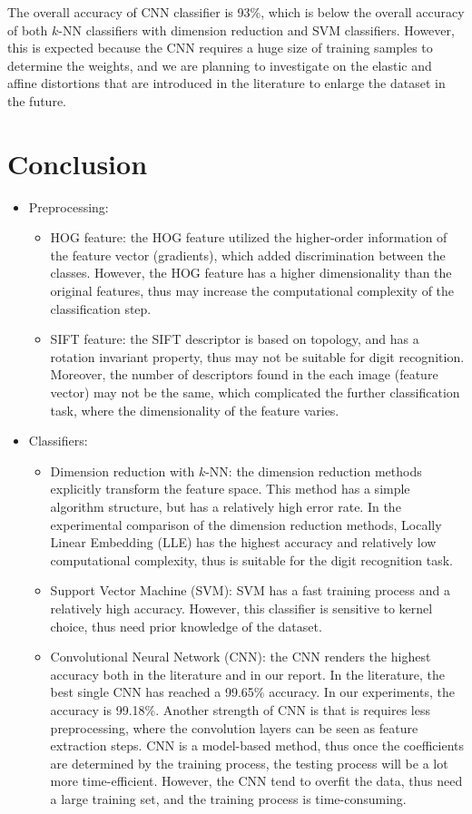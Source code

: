 \documentclass[12pt]{article}
\begin{document}
The overall accuracy of CNN classifier is 93\%, which is below the overall accuracy of both $k$-NN classifiers with dimension reduction and SVM classifiers. However, this is expected because the CNN requires a huge size of training samples to determine the weights, and we are planning to investigate on the elastic and affine distortions that are introduced in the literature \cite{cirecsan2011convolutional, ciresan2012multi} to enlarge the dataset in the future.

\section{Conclusion}
\begin{itemize}
	\item Preprocessing:
	\begin{itemize}
		\item HOG feature: the HOG feature utilized the higher-order information of the feature vector (gradients), which added discrimination between the classes. However, the HOG feature has a higher dimensionality than the original features, thus may increase the computational complexity of the classification step.
		\item SIFT feature: the SIFT descriptor is based on topology, and has a rotation invariant property, thus may not be suitable for digit recognition. Moreover, the number of descriptors found in the each image (feature vector) may not be the same, which complicated the further classification task, where the dimensionality of the feature varies.
	\end{itemize}
	\item Classifiers:
	\begin{itemize}
		\item Dimension reduction with $k$-NN: the dimension reduction methods explicitly transform the feature space. This method has a simple algorithm structure, but has a relatively high error rate. In the experimental comparison of the dimension reduction methods, Locally Linear Embedding (LLE) has the highest accuracy and relatively low computational complexity, thus is suitable for the digit recognition task.
		\item Support Vector Machine (SVM): SVM has a fast training process and a relatively high accuracy. However, this classifier is sensitive to kernel choice, thus need prior knowledge of the dataset.
		\item Convolutional Neural Network (CNN): the CNN renders the highest accuracy both in the literature and in our report. In the literature, the best single CNN has reached a 99.65\% accuracy. In our experiments, the accuracy is 99.18\%. Another strength of CNN is that is requires less preprocessing, where the convolution layers can be seen as feature extraction steps. CNN is a model-based method, thus once the coefficients are determined by the training process, the testing process will be a lot more time-efficient. However, the CNN tend to overfit the data, thus need a large training set, and the training process is time-consuming.
	\end{itemize}
\end{itemize}
\end{document}
